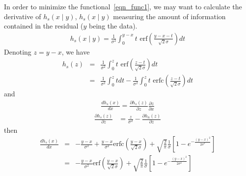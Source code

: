 In order to minimize the functional~\ref{eqn_func1}, we may want to calculate
the derivative of $h_s(x \mid y)$, $h_s(x \mid 
y)$ measuring the amount of information
contained in the residual ($y$ being the data).
\begin{eqnarray}
h_s(x \mid y) = \frac{1}{\sigma^{2}} \int_{0}^{y-x} t \mbox{ erf}(\frac{y-x-t}{\sqrt{2}\sigma}) dt
\end{eqnarray}
Denoting $z = y - x$, we have
\begin{eqnarray}
h_s(z) &  =  & \frac{1}{\sigma^{2}} \int_{0}^{z} t \mbox{ erf}(\frac{z-t}{\sqrt{2}\sigma}) dt \\
       &  =  & \frac{1}{\sigma^{2}} \int_{0}^{z} t dt - \frac{1}{\sigma^{2}} \int_{0}^{z} t \mbox{ erfc}(\frac{z-t}{\sqrt{2}\sigma}) dt
\end{eqnarray} 
and
\begin{eqnarray}
\frac{d h_s(x)}{dx} = \frac{\partial h_s(z)}{\partial z} \frac{\partial z}{\partial x}
\end{eqnarray}
\begin{eqnarray}
\frac{\partial h_s(z)}{\partial z} & = \frac{z}{\sigma^2} - \frac{\partial h_n(z)}{\partial z}
 \end{eqnarray}
then
\begin{eqnarray}
\frac{d h_s(x)}{dx} & = & - \frac{y-x}{\sigma^2} + \frac{y-x}{\sigma^2}\mbox{erfc}(\frac{y-x}{\sqrt{2}\sigma}) + \sqrt{\frac{2}{\pi}}\frac{1}{\sigma}[1 - e^{-\frac{(y-x)^{2}}{2\sigma^{2}}}] \\
                    & = & - \frac{y-x}{\sigma^2} \mbox{erf}(\frac{y-x}{\sqrt{2}\sigma}) + \sqrt{\frac{2}{\pi}}\frac{1}{\sigma}[1 - e^{-\frac{(y-x)^{2}}{2\sigma^{2}}}]
\end{eqnarray}
